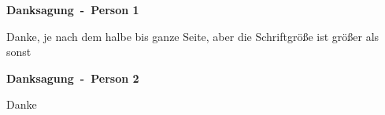 \begin{flushleft}

	\newpage
	\large

	\textbf{\huge Danksagung~-~Person 1\\}
	\vspace{1cm}

	Danke, je nach dem halbe bis ganze Seite, aber die Schriftgröße ist größer als sonst

	\newpage

	\textbf{\huge Danksagung~-~Person 2\\}
	\vspace{1cm}

	Danke

	\newpage
\end{flushleft}